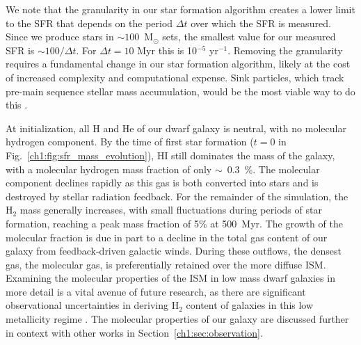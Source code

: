 We note that the granularity in our star formation algorithm creates a lower limit to the SFR that depends on the period $\Delta t$ over which the SFR is measured. Since we produce stars in $\sim 100$~M$_{\odot}$ sets, the smallest value for our measured SFR is $\sim 100/ \Delta t$. For $\Delta t = 10$ Myr this is 10$^{-5}$ yr$^{-1}$. Removing the granularity requires a fundamental change in our star formation algorithm, likely at the cost of increased complexity and computational expense. Sink particles, which track pre-main sequence stellar mass accumulation, would be the most viable way to do this \citep[see for example ][]{Krumholz2004,Federrath2010,GongOstriker2013,BleulerTeyssier2014,Sormani2017}.

At initialization, all H and He of our dwarf galaxy is neutral, with no molecular hydrogen component. By the time of first star formation ($t=0$ in Fig.~\ref{ch1:fig:sfr_mass_evolution}), HI still dominates the mass of the galaxy, with a molecular hydrogen mass fraction of only $\sim$~0.3~\%. The molecular component declines rapidly as this gas is both converted into stars and is destroyed by stellar radiation feedback. For the remainder of the simulation, the H$_2$ mass generally increases,  with small fluctuations during periods of star formation, reaching a peak mass fraction of 5\% at 500~Myr. The growth of the molecular fraction is due in part to a decline in the total gas content of our galaxy from feedback-driven galactic winds. During these outflows, the densest gas, the molecular gas, is preferentially retained over the more diffuse ISM. Examining the molecular properties of the ISM in low mass dwarf galaxies in more detail is a vital avenue of future research, as there are significant observational uncertainties in deriving H$_2$ content of galaxies in this low metallicity regime \citep{Leroy2008,McQuinn2012,Amorin2016}. The molecular properties of our galaxy are discussed further in context with other works in Section~\ref{ch1:sec:observation}.

